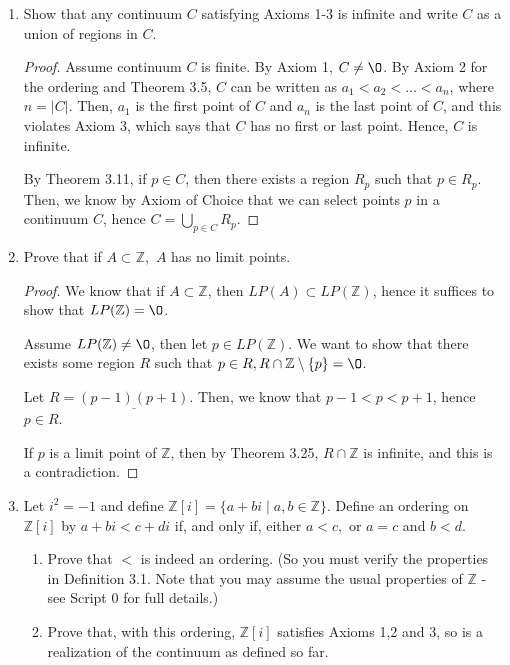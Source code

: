 \documentclass[11pt]{article}
\newcommand{\bbZ}{\mathbb{Z}}
\renewcommand{\emptyset}{\O}
\renewcommand{\_}[1]{\underline{ #1 }}
\theoremstyle{definition}
\numberwithin{equation}{subsection}
\begin{document}
\begin{enumerate}
\item Show that any continuum $C$ satisfying Axioms 1-3 is infinite and write $C$ as a union of regions in $C.$
\begin{proof}
Assume continuum $C$ is finite. By Axiom 1, $C \not= \emptyset$. By Axiom 2 for the ordering and Theorem 3.5, $C$ can be written as $a_1 < a_2 < \dots < a_n$, where $n = |C|$. Then, $a_1$ is the first point of $C$ and $a_n$ is the last point of $C$, and this violates Axiom 3, which says that $C$ has no first or last point. Hence, $C$ is infinite.

By Theorem 3.11, if $p \in C$, then there exists a region $R_p$ such that $p \in R_p$. Then, we know by Axiom of Choice that we can select points $p$ in a continuum $C$, hence $C = \bigcup_{p \in C} R_p$. 

\renewcommand\qedsymbol{QED}
\end{proof}


\item  Prove that if $A\subset\bbZ,$ $A $ has no limit points.
\begin{proof}
We know that if $A \subset \bbZ$, then $LP(A) \subset LP(\bbZ)$, hence it suffices to show that $LP(\bbZ) = \emptyset$.

Assume $LP(\bbZ) \not= \emptyset$, then let $p \in LP(\bbZ)$. We want to show that there exists some region $R$ such that $p \in R, R\cap \bbZ \setminus \{p\} = \emptyset$.

Let $R = \_{(p-1)(p+1)}$. Then, we know that $p-1 <p<p+1$, hence $p \in R$.

If $p$ is a limit point of $\bbZ$, then by Theorem 3.25, $R \cap \bbZ$ is infinite, and this is a contradiction.

\renewcommand\qedsymbol{QED}
\end{proof}

\item Let $i^2=-1$ and define $\bbZ [i]=\{a+bi\mid a,b\in\bbZ\}.$ Define an ordering on $\bbZ[i]$ by $a+bi<c+di$ if, and only if,
either $a<c,$ or $a=c$ and $b<d.$
\begin{enumerate}
\item Prove that $<$ is indeed an ordering. (So you must verify the properties in Definition 3.1. Note that you may assume the usual properties of $\bbZ$ - see Script 0 for full details.)
\item Prove that, with this ordering, $\bbZ[i]$ satisfies Axioms 1,2 and 3, so is a realization of the continuum as defined so far. 




\end{enumerate}
\end{enumerate}
\end{document}
